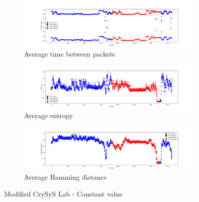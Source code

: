 \begin{figure}
    \centering
    \begin{subfigure}[b]{\linewidth}
        \includegraphics[width = \linewidth]{img/parts/app/tests/crysys/const/AvgTime.png}
        \caption{Average time between packets}
        \label{subfig:extract_crysys_const_avgtime}
    \end{subfigure}
    \begin{subfigure}[b]{\linewidth}
        \includegraphics[width = \linewidth]{img/parts/app/tests/crysys/const/Entropy.png}
        \caption{Average entropy}
        \label{subfig:extract_crysys_const_entropy}
    \end{subfigure}
    \begin{subfigure}[b]{\linewidth}
        \includegraphics[width = \linewidth]{img/parts/app/tests/crysys/const/HammingDist.png}
        \caption{Average Hamming distance}
        \label{subfig:extract_crysys_const_hammingdist}
    \end{subfigure}
    \caption{Modified CrySyS Lab - Constant value}
    \label{fig:extract_crysys_const}
\end{figure}

